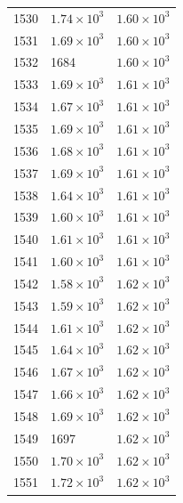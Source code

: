 \begin{table}[H]
\begin{tabular}{lll}
1530 & $\displaystyle 1.74 \times 10^{3}$ & $\displaystyle 1.60 \times 10^{3}$ \\
1531 & $\displaystyle 1.69 \times 10^{3}$ & $\displaystyle 1.60 \times 10^{3}$ \\
1532 & 1684 & $\displaystyle 1.60 \times 10^{3}$ \\
1533 & $\displaystyle 1.69 \times 10^{3}$ & $\displaystyle 1.61 \times 10^{3}$ \\
1534 & $\displaystyle 1.67 \times 10^{3}$ & $\displaystyle 1.61 \times 10^{3}$ \\
1535 & $\displaystyle 1.69 \times 10^{3}$ & $\displaystyle 1.61 \times 10^{3}$ \\
1536 & $\displaystyle 1.68 \times 10^{3}$ & $\displaystyle 1.61 \times 10^{3}$ \\
1537 & $\displaystyle 1.69 \times 10^{3}$ & $\displaystyle 1.61 \times 10^{3}$ \\
1538 & $\displaystyle 1.64 \times 10^{3}$ & $\displaystyle 1.61 \times 10^{3}$ \\
1539 & $\displaystyle 1.60 \times 10^{3}$ & $\displaystyle 1.61 \times 10^{3}$ \\
1540 & $\displaystyle 1.61 \times 10^{3}$ & $\displaystyle 1.61 \times 10^{3}$ \\
1541 & $\displaystyle 1.60 \times 10^{3}$ & $\displaystyle 1.61 \times 10^{3}$ \\
1542 & $\displaystyle 1.58 \times 10^{3}$ & $\displaystyle 1.62 \times 10^{3}$ \\
1543 & $\displaystyle 1.59 \times 10^{3}$ & $\displaystyle 1.62 \times 10^{3}$ \\
1544 & $\displaystyle 1.61 \times 10^{3}$ & $\displaystyle 1.62 \times 10^{3}$ \\
1545 & $\displaystyle 1.64 \times 10^{3}$ & $\displaystyle 1.62 \times 10^{3}$ \\
1546 & $\displaystyle 1.67 \times 10^{3}$ & $\displaystyle 1.62 \times 10^{3}$ \\
1547 & $\displaystyle 1.66 \times 10^{3}$ & $\displaystyle 1.62 \times 10^{3}$ \\
1548 & $\displaystyle 1.69 \times 10^{3}$ & $\displaystyle 1.62 \times 10^{3}$ \\
1549 & 1697 & $\displaystyle 1.62 \times 10^{3}$ \\
1550 & $\displaystyle 1.70 \times 10^{3}$ & $\displaystyle 1.62 \times 10^{3}$ \\
1551 & $\displaystyle 1.72 \times 10^{3}$ & $\displaystyle 1.62 \times 10^{3}$ \\

\end{tabular}
\end{table}

